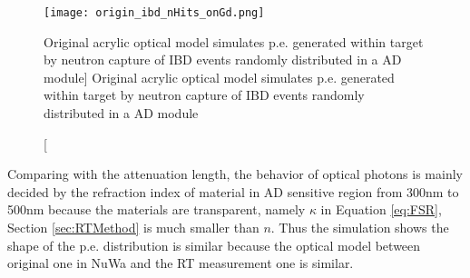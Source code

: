 \begin{figure}
    \centering
    \texttt{[image: origin\_ibd\_nHits\_onGd.png]}
    \caption
    [Original acrylic optical model simulates p.e. generated within target by neutron capture of IBD events randomly distributed in a AD module]
    {Original acrylic optical model simulates p.e. generated within target by neutron capture of IBD events randomly distributed in a AD module}
    \label{fig:origin_ibd_nHits_onGd}
    \end{figure}

%
%
%
%
%

Comparing with the attenuation length, the behavior of optical photons is mainly decided by the refraction index of material in AD sensitive
region from 300nm to 500nm because the materials are transparent, namely $\kappa$ in Equation \ref{eq:FSR}, Section \ref{sec:RTMethod}
is much smaller than $n$. Thus the simulation shows the shape of the p.e. distribution is similar
because the optical model between original one in NuWa and the RT measurement one is similar.


